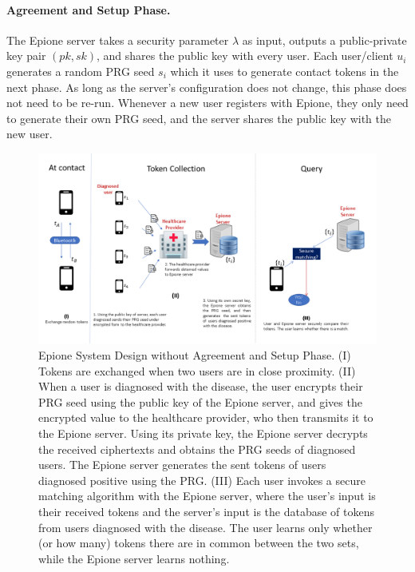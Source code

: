 \documentclass[11pt]{article} %
\newcommand{\dect}{\textsf{Epione}\xspace}
\newcommand{\remove}[1]{}
\begin{document}
\paragraph{Agreement and Setup Phase.}  

\remove{The first phase requires all parties (including users, the healthcare provider, and the \dect server) to agree to perform the objective function (e.g. contact tracing) over their joint data, and security parameters for MPC.  The parties should also agree to release the computed result to each user. This agreement might happen before the user installs \dect on their phone.}


The \dect server takes a security parameter $\lambda$ as input, outputs a public-private key pair $(pk, sk)$, and shares the public key with every user. Each user/client $u_i$ generates a random PRG seed $s_i$ which it uses to generate contact tokens in the next phase. 
As long as the server's configuration does not change, this phase does not need to be re-run. Whenever a new user registers with \dect, they only need to generate their own PRG seed, and the server shares the public key with the new user. 


\begin{figure}[t]
	\centering
	\includegraphics[scale=0.51,bb= 0 0 960 540]{figs/system.png}
	\caption{\dect System Design without Agreement and Setup Phase. (I) Tokens are exchanged when two users are in close proximity. (II) When a user is diagnosed with the disease, the user encrypts their PRG seed using the public key of the \dect server, and gives the encrypted value to the healthcare provider, who then transmits it to the \dect server. Using its private key, the \dect server decrypts the received ciphertexts and obtains the PRG seeds of diagnosed users. The \dect server generates the sent tokens of users diagnosed positive using the PRG. (III) Each user invokes a secure matching algorithm with the \dect server, where the user's input is their received tokens and the server's input is the database of tokens from users diagnosed with the disease. The user learns only whether (or how many) tokens there are in common between the two sets, while the \dect server learns nothing.
	}
	\label{fig:system}
\end{figure} %
\end{document}
